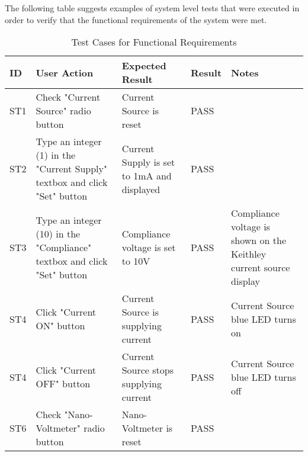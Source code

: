 \documentclass[12pt, titlepage]{article}
\begin{document}
\noindent The following table suggests examples of system level tests that were executed in order to verify that the functional requirements of the system were met.

\begin{table}[H]
	\centering
	\caption{Test Cases for Functional Requirements}
	\label{my-label}
	\begin{tabular}{|p{0.85cm}|p{3.5cm}|p{3.5cm}|p{1.3cm}|p{3cm}|}
		\hline
		\textbf{ID} & \textbf{User Action} & \textbf{Expected Result}  & \textbf{Result}  & \textbf{Notes}  \\ \hline
		ST1 & Check "Current Source" radio button & Current Source is reset & PASS &\\ \hline
		ST2 & Type an integer (1) in the "Current Supply" textbox and click "Set" button & Current Supply is set to 1mA and displayed & PASS &\\ \hline
		ST3 & Type an integer (10) in the "Compliance" textbox and click "Set" button & Compliance voltage is set to 10V & PASS & Compliance voltage is shown on the Keithley current source display \\ \hline
		ST4 & Click "Current ON" button & Current Source is supplying current & PASS & Current Source blue LED turns on \\ \hline
		ST4 & Click "Current OFF" button & Current Source stops supplying current & PASS & Current Source blue LED turns off \\ \hline
		ST6 & Check "Nano-Voltmeter" radio button & Nano-Voltmeter is reset & PASS &\\ \hline
	\end{tabular}
\end{table}

\end{document}
